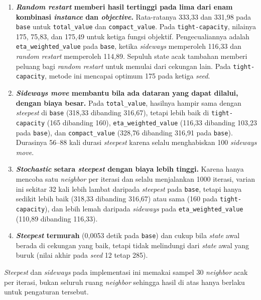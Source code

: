 \begin{enumerate}
    \item \textbf{\textit{Random restart} memberi hasil tertinggi pada lima dari enam kombinasi \textit{instance} dan \textit{objective}.} Rata-ratanya 333,33 dan 331,98 pada \texttt{base} untuk \texttt{total\_value} dan \texttt{compact\_value}. Pada \texttt{tight-capacity}, nilainya 175, 75,83, dan 175,49 untuk ketiga fungsi objektif. Pengecualiannya adalah \texttt{eta\_weighted\_value} pada \texttt{base}, ketika \textit{sideways} memperoleh 116,33 dan \textit{random restart} memperoleh 114,89. Sepuluh state acak tambahan memberi peluang bagi \textit{random restart} untuk memulai dari cekungan lain. Pada \texttt{tight-capacity}, metode ini mencapai optimum 175 pada ketiga \textit{seed}.
    \item \textbf{\textit{Sideways move} membantu bila ada dataran yang dapat dilalui, dengan biaya besar.} Pada \texttt{total\_value}, hasilnya hampir sama dengan \textit{steepest} di \texttt{base} (318,33 dibanding 316,67), tetapi lebih baik di \texttt{tight-capacity} (165 dibanding 160), \texttt{eta\_weighted\_value} (116,33 dibanding 103,23 pada \texttt{base}), dan \texttt{compact\_value} (328,76 dibanding 316,91 pada \texttt{base}). Durasinya 56--88 kali durasi \textit{steepest} karena selalu menghabiskan 100 \textit{sideways move}.
    \item \textbf{\textit{Stochastic} setara \textit{steepest} dengan biaya lebih tinggi.} Karena hanya mencoba satu \textit{neighbor} per iterasi dan selalu menjalankan 1000 iterasi, varian ini sekitar 32 kali lebih lambat daripada \textit{steepest} pada \texttt{base}, tetapi hanya sedikit lebih baik (318,33 dibanding 316,67) atau sama (160 pada \texttt{tight-capacity}), dan lebih lemah daripada \textit{sideways} pada \texttt{eta\_weighted\_value} (110,89 dibanding 116,33).
    \item \textbf{\textit{Steepest} termurah} (0,0053 detik pada \texttt{base}) dan cukup bila \textit{state} awal berada di cekungan yang baik, tetapi tidak melindungi dari \textit{state} awal yang buruk (nilai akhir pada \textit{seed} 12 tetap 285).
\end{enumerate}

\textit{Steepest} dan \textit{sideways} pada implementasi ini memakai sampel 30 \textit{neighbor} acak per iterasi, bukan seluruh ruang \textit{neighbor} sehingga hasil di atas hanya berlaku untuk pengaturan tersebut.

